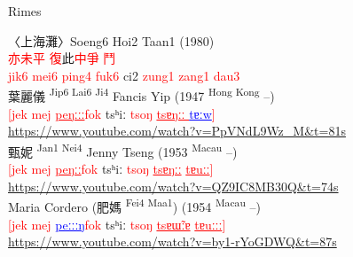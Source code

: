\documentclass{beamer}
\begin{document}
\begin{frame}[fragile]{Rimes}

〈上海灘〉Soeng6 Hoi2 Taan1 (1980)\\
\medskip
\textcolor{red}{亦未平 \quad 復}此\textcolor{red}{中爭 \quad 鬥}\\
\textcolor{red}{jik6 mei6 ping4 fuk6 }ci2 \textcolor{red}{zung1 zang1 dau3}\\

\medskip
葉麗儀 \textsuperscript{Jip6 Lai6 Ji4} Fancis Yip (1947 \textsuperscript{Hong Kong} –)\\
\textcolor{red}{{[}jek mej \underline{peŋːːː}\quad fok }tsʰiː \textcolor{red}{tsoŋ \underline{tsɐŋːː }}\textcolor{blue}{\underline{tɐːw}}\textcolor{red}{]}\\
{\tiny \url{https://www.youtube.com/watch?v=PpVNdL9Wz_M&t=81s}}\\
\smallskip
甄妮 \textsuperscript{Jan1 Nei4} Jenny Tseng (1953 \textsuperscript{Macau} –)\\
\textcolor{red}{{[}jek mej \underline{peŋːː}\quad fok }tsʰiː \textcolor{red}{tsoŋ \underline{tsɐŋːː} \underline{tɐuːː}{]}}\\
{\tiny \url{https://www.youtube.com/watch?v=QZ9IC8MB30Q&t=74s}}\\
\smallskip
Maria Cordero (肥媽 \textsuperscript{Fei4 Maa1}) (1954 \textsuperscript{Macau} –)\\
\textcolor{red}{{[}jek mej }\textcolor{blue}{\underline{peːːːŋ}}\quad \textcolor{red}{fok }tsʰiː \textcolor{red}{tsoŋ \underline{tsɐɯ̃ːɐ} \underline{tɐuːːː}{]}}\\
{\tiny \url{https://www.youtube.com/watch?v=by1-rYoGDWQ&t=87s}}\\

\end{frame}
\end{document}
